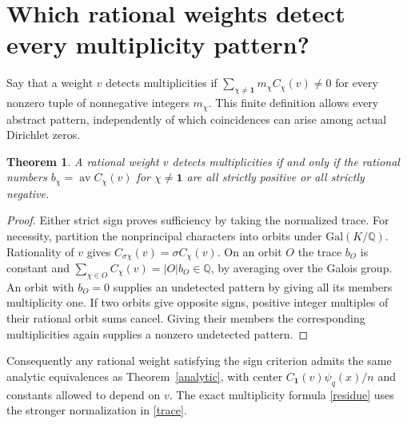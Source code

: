 \documentclass[11pt]{article}
\newtheorem{thm}{Theorem}
\newcommand{\av}{\operatorname{av}}
\newcommand{\one}{\mathbf{1}}
\newcommand{\pn}{\psi_q}
\begin{document}
\section{Which rational weights detect every multiplicity pattern?}
Say that a weight $v$ detects multiplicities if $\sum_{\chi\ne\one}m_\chi C_\chi(v)\ne0$ for every nonzero tuple of nonnegative integers $m_\chi$. This finite definition allows every abstract pattern, independently of which coincidences can arise among actual Dirichlet zeros.
\begin{thm}\label{rational}
A rational weight $v$ detects multiplicities if and only if the rational numbers $b_\chi=\av C_\chi(v)$ for $\chi\ne\one$ are all strictly positive or all strictly negative.
\end{thm}
\begin{proof}
Either strict sign proves sufficiency by taking the normalized trace. For necessity, partition the nonprincipal characters into orbits under $\mathrm{Gal}(K/\mathbb Q)$. Rationality of $v$ gives $C_{\sigma\chi}(v)=\sigma C_\chi(v)$. On an orbit $O$ the trace $b_O$ is constant and $\sum_{\chi\in O}C_\chi(v)=|O|b_O\in\mathbb Q$, by averaging over the Galois group. An orbit with $b_O=0$ supplies an undetected pattern by giving all its members multiplicity one. If two orbits give opposite signs, positive integer multiples of their rational orbit sums cancel. Giving their members the corresponding multiplicities again supplies a nonzero undetected pattern.
\end{proof}
Consequently any rational weight satisfying the sign criterion admits the same analytic equivalences as Theorem~\ref{analytic}, with center $C_{\one}(v)\pn(x)/n$ and constants allowed to depend on $v$. The exact multiplicity formula \eqref{residue} uses the stronger normalization in \eqref{trace}.
\end{document}
